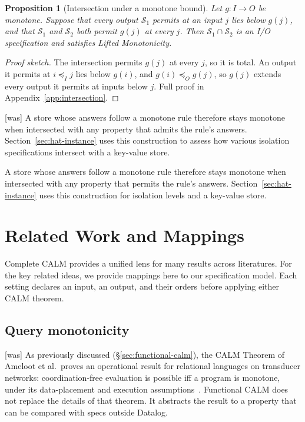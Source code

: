 \documentclass[sigconf]{cidr-2027}
\newtheorem{proposition}{Proposition}
\theoremstyle{remark}
\newcommand{\InputOrd}{\preceq_I}
\newcommand{\OutputOrd}{\preceq_O}
\newcommand{\outrel}{extends\xspace}          %
\newcommand{\Spec}{\mathcal{S}}
\newcommand{\spectype}[1][]{I/O specification#1\xspace}
\begin{document}
\begin{proposition}[Intersection under a monotone bound]
\label{prop:intersection-bound}
Let $g:I\to O$ be monotone.  Suppose that every output $\Spec_1$ permits at an
input $j$ lies below $g(j)$, and that $\Spec_1$ and $\Spec_2$ both permit $g(j)$
at every $j$.  Then $\Spec_1\cap\Spec_2$ is an \spectype and satisfies Lifted
Monotonicity.
\end{proposition}

\begin{proof}[Proof sketch]
The intersection permits $g(j)$ at every $j$, so it is total.  An output it
permits at $i\InputOrd j$ lies below $g(i)$, and $g(i)\OutputOrd g(j)$, so
$g(j)$ \outrel every output it permits at inputs below $j$.  Full proof in
Appendix~\ref{app:intersection}.
\end{proof}



{\footnotesize\color{black!50}\noindent\textsf{[was]} A store whose answers follow a monotone rule therefore stays monotone when
intersected with any property that admits the rule's answers.
Section~\ref{sec:hat-instance} uses this construction to assess how various
isolation specifications intersect with a key-value store.\par}

\color{blue!70!black}A store whose answers follow a monotone rule therefore stays monotone when
intersected with any property that permits the rule's answers.
Section~\ref{sec:hat-instance} uses this construction for isolation levels and
a key-value store.\color{black}

\section{Related Work and Mappings}
\label{sec:instances}
\label{sec:related}

Complete CALM provides a unified lens for many results across literatures.
For the key related ideas, we provide mappings here to our specification model.
Each setting declares an input, an output, and their orders before
applying either CALM theorem.

\subsection{Query monotonicity}
\label{sec:query-instance}



{\footnotesize\color{black!50}\noindent\textsf{[was]} As previously discussed (\S\ref{sec:functional-calm}),
the CALM Theorem of Ameloot et al.\ proves an operational result for
relational languages on transducer networks: coordination-free evaluation is possible
iff a program is monotone,
under its data-placement and execution assumptions~\cite{ameloot2013relational,ameloot2015weaker}.
Functional CALM does not replace the details of that theorem.  It abstracts
the result to a property that can be compared with specs outside
Datalog.\par}
\end{document}
